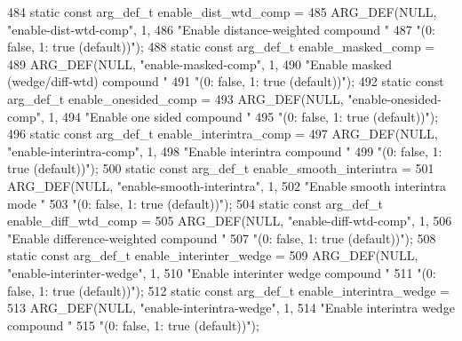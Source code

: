 \begin{DoxyCodeInclude}
{{{{{{{484 \textcolor{keyword}{static} \textcolor{keyword}{const} arg\_def\_t enable\_dist\_wtd\_comp =
485     ARG\_DEF(NULL, \textcolor{stringliteral}{"enable-dist-wtd-comp"}, 1,
486             \textcolor{stringliteral}{"Enable distance-weighted compound "}
487             \textcolor{stringliteral}{"(0: false, 1: true (default))"});
488 \textcolor{keyword}{static} \textcolor{keyword}{const} arg\_def\_t enable\_masked\_comp =
489     ARG\_DEF(NULL, \textcolor{stringliteral}{"enable-masked-comp"}, 1,
490             \textcolor{stringliteral}{"Enable masked (wedge/diff-wtd) compound "}
491             \textcolor{stringliteral}{"(0: false, 1: true (default))"});
492 \textcolor{keyword}{static} \textcolor{keyword}{const} arg\_def\_t enable\_onesided\_comp =
493     ARG\_DEF(NULL, \textcolor{stringliteral}{"enable-onesided-comp"}, 1,
494             \textcolor{stringliteral}{"Enable one sided compound "}
495             \textcolor{stringliteral}{"(0: false, 1: true (default))"});
496 \textcolor{keyword}{static} \textcolor{keyword}{const} arg\_def\_t enable\_interintra\_comp =
497     ARG\_DEF(NULL, \textcolor{stringliteral}{"enable-interintra-comp"}, 1,
498             \textcolor{stringliteral}{"Enable interintra compound "}
499             \textcolor{stringliteral}{"(0: false, 1: true (default))"});
500 \textcolor{keyword}{static} \textcolor{keyword}{const} arg\_def\_t enable\_smooth\_interintra =
501     ARG\_DEF(NULL, \textcolor{stringliteral}{"enable-smooth-interintra"}, 1,
502             \textcolor{stringliteral}{"Enable smooth interintra mode "}
503             \textcolor{stringliteral}{"(0: false, 1: true (default))"});
504 \textcolor{keyword}{static} \textcolor{keyword}{const} arg\_def\_t enable\_diff\_wtd\_comp =
505     ARG\_DEF(NULL, \textcolor{stringliteral}{"enable-diff-wtd-comp"}, 1,
506             \textcolor{stringliteral}{"Enable difference-weighted compound "}
507             \textcolor{stringliteral}{"(0: false, 1: true (default))"});
508 \textcolor{keyword}{static} \textcolor{keyword}{const} arg\_def\_t enable\_interinter\_wedge =
509     ARG\_DEF(NULL, \textcolor{stringliteral}{"enable-interinter-wedge"}, 1,
510             \textcolor{stringliteral}{"Enable interinter wedge compound "}
511             \textcolor{stringliteral}{"(0: false, 1: true (default))"});
512 \textcolor{keyword}{static} \textcolor{keyword}{const} arg\_def\_t enable\_interintra\_wedge =
513     ARG\_DEF(NULL, \textcolor{stringliteral}{"enable-interintra-wedge"}, 1,
514             \textcolor{stringliteral}{"Enable interintra wedge compound "}
515             \textcolor{stringliteral}{"(0: false, 1: true (default))"});
}}}}}}}
\end{DoxyCodeInclude}
